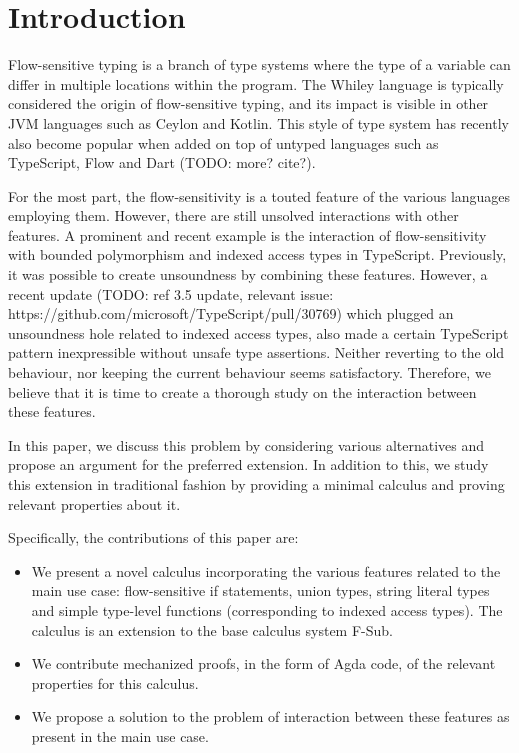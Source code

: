 \section{Introduction}
\label{sec:intro}

Flow-sensitive typing is a branch of type systems where the type of a variable can differ in multiple locations within the program. The Whiley language is typically considered the origin of flow-sensitive typing, and its impact is visible in other JVM languages such as Ceylon and Kotlin. This style of type system has recently also become popular when added on top of untyped languages such as TypeScript, Flow and Dart (TODO: more? cite?).

For the most part, the flow-sensitivity is a touted feature of the various languages employing them. However, there are still unsolved interactions with other features. A prominent and recent example is the interaction of flow-sensitivity with bounded polymorphism and indexed access types in TypeScript. Previously, it was possible to create unsoundness by combining these features. However, a recent update (TODO: ref 3.5 update, relevant issue: https://github.com/microsoft/TypeScript/pull/30769) which plugged an unsoundness hole related to indexed access types, also made a certain TypeScript pattern inexpressible without unsafe type assertions. Neither reverting to the old behaviour, nor keeping the current behaviour seems satisfactory. Therefore, we believe that it is time to create a thorough study on the interaction between these features.

In this paper, we discuss this problem by considering various alternatives and propose an argument for the preferred extension. In addition to this, we study this extension in traditional fashion by providing a minimal calculus and proving relevant properties about it.

Specifically, the contributions of this paper are:

\begin{itemize}
\item We present a novel calculus incorporating the various features related to the main use case: flow-sensitive if statements, union types, string literal types and simple type-level functions (corresponding to indexed access types). The calculus is an extension to the base calculus system F-Sub.
\item We contribute mechanized proofs, in the form of Agda code, of the relevant properties for this calculus.
\item We propose a solution to the problem of interaction between these features as present in the main use case.
\end{itemize}

